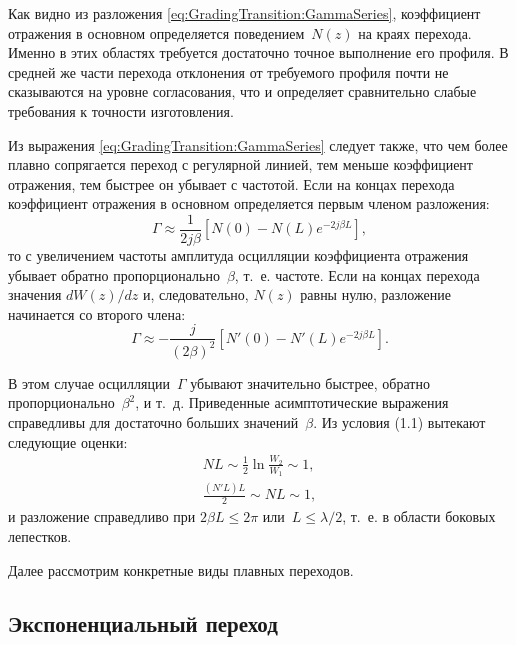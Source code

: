 Как видно из разложения \eqref{eq:GradingTransition:GammaSeries}, коэффициент отражения в основном определяется
поведением~$N(z)$ на краях перехода. Именно в этих областях требуется достаточно
точное выполнение его профиля. В средней же части перехода отклонения от
требуемого профиля почти не сказываются на уровне согласования, что и определяет
сравнительно слабые требования к точности изготовления.

Из выражения \eqref{eq:GradingTransition:GammaSeries} следует также, что чем более плавно сопрягается переход
с регулярной линией, тем меньше коэффициент отражения, тем быстрее он убывает
с частотой. Если  на концах перехода коэффициент отражения в основном
определяется первым членом разложения:
\begin{equation}
    \label{eq:GradingTransition:GammaFirstComponent}
    \Gamma \approx \frac{1}{2j\beta}
    \left[
        N(0) - N(L) e^{-2j\beta L}
    \right],
\end{equation}
то с увеличением частоты амплитуда осцилляции коэффициента отражения убывает
обратно пропорционально~$\beta$, т.~е. частоте. Если на концах перехода значения
$dW(z)/dz$ и, следовательно, $N(z)$ равны нулю, разложение начинается со второго
члена:
\begin{equation*}
    \Gamma \approx - \frac{j}{(2\beta)^2}
    \left[
        N'(0) - N'(L) e^{-2j\beta L}
    \right].
\end{equation*}

В этом случае осцилляции~$\Gamma$ убывают значительно быстрее, обратно
пропорционально~$\beta^2$, и т.~д. Приведенные асимптотические выражения
справедливы для достаточно больших значений~$\beta$. Из условия (1.1) вытекают
следующие оценки:
\begin{gather*}
    NL \sim \frac{1}{2} \ln\frac{W_2}{W_1} \sim 1, \\
    \frac{(N'L)L}{2} \sim NL \sim 1,
\end{gather*}
и разложение справедливо при $2\beta L \le 2\pi$ или~$L \le \lambda/2$, т.~е.
в области боковых лепестков.

Далее рассмотрим конкретные виды плавных переходов.


\subsection{Экспоненциальный переход}

